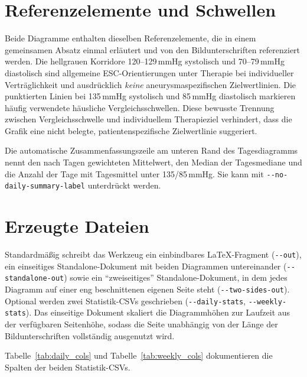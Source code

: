 \documentclass[conference]{IEEEtran}
\newcommand{\param}[1]{\texttt{#1}}
\begin{document}
\section{Referenzelemente und Schwellen}
Beide Diagramme enthalten dieselben Referenzelemente, die in einem gemeinsamen
Absatz einmal erläutert und von den Bildunterschriften referenziert werden. Die
hellgrauen Korridore 120--129\,mmHg systolisch und 70--79\,mmHg diastolisch sind
allgemeine ESC-Orientierungen unter Therapie bei individueller Verträglichkeit
und ausdrücklich \emph{keine} aneurysmaspezifischen Zielwertlinien. Die
punktierten Linien bei 135\,mmHg systolisch und 85\,mmHg diastolisch markieren
häufig verwendete häusliche Vergleichsschwellen. Diese bewusste Trennung
zwischen Vergleichsschwelle und individuellem Therapieziel verhindert, dass die
Grafik eine nicht belegte, patientenspezifische Zielwertlinie suggeriert.

Die automatische Zusammenfassungszeile am unteren Rand des Tagesdiagramms nennt
den nach Tagen gewichteten Mittelwert, den Median der Tagesmediane und die
Anzahl der Tage mit Tagesmittel unter 135/85\,mmHg. Sie kann mit
\param{-{}-no-daily-summary-label} unterdrückt werden.

\section{Erzeugte Dateien}
Standardmäßig schreibt das Werkzeug ein einbindbares LaTeX-Fragment
(\param{-{}-out}), ein einseitiges Standalone-Dokument mit beiden Diagrammen
untereinander (\param{-{}-standalone-out}) sowie ein ``zweiseitiges''
Standalone-Dokument, in dem jedes Diagramm auf einer eng beschnittenen eigenen
Seite steht (\param{-{}-two-sides-out}). Optional werden zwei Statistik-CSVs
geschrieben (\param{-{}-daily-stats}, \param{-{}-weekly-stats}). Das einseitige
Dokument skaliert die Diagrammhöhen zur Laufzeit aus der verfügbaren Seitenhöhe,
sodass die Seite unabhängig von der Länge der Bildunterschriften vollständig
ausgenutzt wird.

Tabelle~\ref{tab:daily_cols} und Tabelle~\ref{tab:weekly_cols} dokumentieren die
Spalten der beiden Statistik-CSVs.
\end{document}
